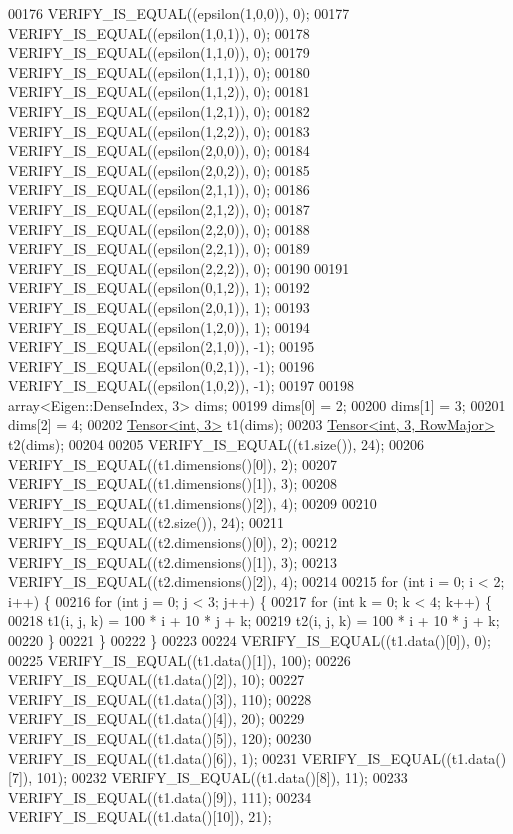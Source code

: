 \begin{DoxyCode}
00176   VERIFY\_IS\_EQUAL((epsilon(1,0,0)), 0);
00177   VERIFY\_IS\_EQUAL((epsilon(1,0,1)), 0);
00178   VERIFY\_IS\_EQUAL((epsilon(1,1,0)), 0);
00179   VERIFY\_IS\_EQUAL((epsilon(1,1,1)), 0);
00180   VERIFY\_IS\_EQUAL((epsilon(1,1,2)), 0);
00181   VERIFY\_IS\_EQUAL((epsilon(1,2,1)), 0);
00182   VERIFY\_IS\_EQUAL((epsilon(1,2,2)), 0);
00183   VERIFY\_IS\_EQUAL((epsilon(2,0,0)), 0);
00184   VERIFY\_IS\_EQUAL((epsilon(2,0,2)), 0);
00185   VERIFY\_IS\_EQUAL((epsilon(2,1,1)), 0);
00186   VERIFY\_IS\_EQUAL((epsilon(2,1,2)), 0);
00187   VERIFY\_IS\_EQUAL((epsilon(2,2,0)), 0);
00188   VERIFY\_IS\_EQUAL((epsilon(2,2,1)), 0);
00189   VERIFY\_IS\_EQUAL((epsilon(2,2,2)), 0);
00190 
00191   VERIFY\_IS\_EQUAL((epsilon(0,1,2)), 1);
00192   VERIFY\_IS\_EQUAL((epsilon(2,0,1)), 1);
00193   VERIFY\_IS\_EQUAL((epsilon(1,2,0)), 1);
00194   VERIFY\_IS\_EQUAL((epsilon(2,1,0)), -1);
00195   VERIFY\_IS\_EQUAL((epsilon(0,2,1)), -1);
00196   VERIFY\_IS\_EQUAL((epsilon(1,0,2)), -1);
00197 
00198   array<Eigen::DenseIndex, 3> dims;
00199   dims[0] = 2;
00200   dims[1] = 3;
00201   dims[2] = 4;
00202   \hyperlink{class_eigen_1_1_tensor}{Tensor<int, 3>} t1(dims);
00203   \hyperlink{class_eigen_1_1_tensor}{Tensor<int, 3, RowMajor>} t2(dims);
00204 
00205   VERIFY\_IS\_EQUAL((t1.size()), 24);
00206   VERIFY\_IS\_EQUAL((t1.dimensions()[0]), 2);
00207   VERIFY\_IS\_EQUAL((t1.dimensions()[1]), 3);
00208   VERIFY\_IS\_EQUAL((t1.dimensions()[2]), 4);
00209 
00210   VERIFY\_IS\_EQUAL((t2.size()), 24);
00211   VERIFY\_IS\_EQUAL((t2.dimensions()[0]), 2);
00212   VERIFY\_IS\_EQUAL((t2.dimensions()[1]), 3);
00213   VERIFY\_IS\_EQUAL((t2.dimensions()[2]), 4);
00214 
00215   \textcolor{keywordflow}{for} (\textcolor{keywordtype}{int} i = 0; i < 2; i++) \{
00216     \textcolor{keywordflow}{for} (\textcolor{keywordtype}{int} j = 0; j < 3; j++) \{
00217       \textcolor{keywordflow}{for} (\textcolor{keywordtype}{int} k = 0; k < 4; k++) \{
00218         t1(i, j, k) = 100 * i + 10 * j + k;
00219         t2(i, j, k) = 100 * i + 10 * j + k;
00220       \}
00221     \}
00222   \}
00223 
00224   VERIFY\_IS\_EQUAL((t1.data()[0]),    0);
00225   VERIFY\_IS\_EQUAL((t1.data()[1]),  100);
00226   VERIFY\_IS\_EQUAL((t1.data()[2]),   10);
00227   VERIFY\_IS\_EQUAL((t1.data()[3]),  110);
00228   VERIFY\_IS\_EQUAL((t1.data()[4]),   20);
00229   VERIFY\_IS\_EQUAL((t1.data()[5]),  120);
00230   VERIFY\_IS\_EQUAL((t1.data()[6]),    1);
00231   VERIFY\_IS\_EQUAL((t1.data()[7]),  101);
00232   VERIFY\_IS\_EQUAL((t1.data()[8]),   11);
00233   VERIFY\_IS\_EQUAL((t1.data()[9]),  111);
00234   VERIFY\_IS\_EQUAL((t1.data()[10]),  21);

\end{DoxyCode}
